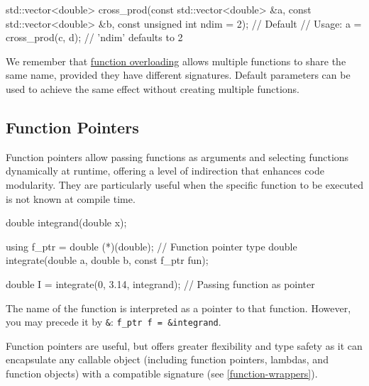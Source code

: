 \vspace{-0.5em}

\begin{codeblock}[language=C++, numbers=none]
std::vector<double> cross_prod(const std::vector<double> &a,
                               const std::vector<double> &b,
                               const unsigned int ndim = 2); // Default
// Usage:
a = cross_prod(c, d); // 'ndim' defaults to 2
\end{codeblock}

\begin{observationblock}
    We remember that \hyperref[function-overloading]{function overloading} allows multiple functions to share the same name, provided they have different signatures. Default parameters can be used to achieve the same effect without creating multiple functions.
\end{observationblock}

\subsection{Function Pointers}

\vspace{-0.2em}

Function pointers allow passing functions as arguments and selecting functions dynamically at runtime, offering a level of indirection that enhances code modularity. They are particularly useful when the specific function to be executed is not known at compile time.

\vspace{-0.2em}

\begin{codeblock}[language=C++, numbers=none]
double integrand(double x);

using f_ptr = double (*)(double); // Function pointer type
double integrate(double a, double b, const f_ptr fun);

double I = integrate(0, 3.14, integrand); // Passing function as pointer
\end{codeblock}

\vspace{-0.2em}

The name of the function is interpreted as a pointer to that function. However, you may precede it by \texttt{\&}: \texttt{f\_ptr f = \&integrand}.

Function pointers are useful, but  offers greater flexibility and type safety as it can encapsulate any callable object (including function pointers, lambdas, and function objects) with a compatible signature (see \cref{function-wrappers}).

